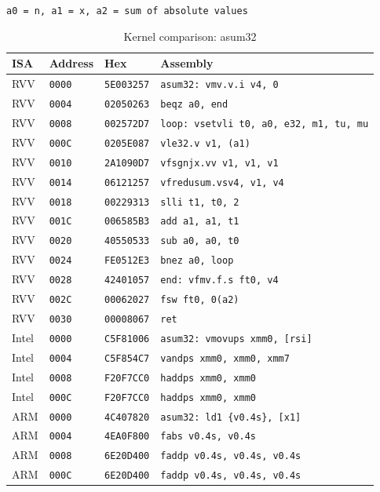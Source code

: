 \begin{table}[htbp]
\centering
\caption{Kernel comparison: asum32}
\begingroup
\scriptsize
\setlength{\tabcolsep}{4pt}
\noindent \texttt{a0 = n, a1 = x, a2 = sum of absolute values}\par
\vspace{0.6ex}
\begin{tabular}{@{}l|l|l|p{7.2cm}@{}}
\toprule
ISA & Address & Hex & Assembly \\
\midrule
RVV & \texttt{0000} & \texttt{5E003257} & \texttt{asum32: vmv.v.i v4, 0} \\
RVV & \texttt{0004} & \texttt{02050263} & \texttt{beqz a0, end} \\
RVV & \texttt{0008} & \texttt{002572D7} & \texttt{loop: vsetvli t0, a0, e32, m1, tu, mu} \\
RVV & \texttt{000C} & \texttt{0205E087} & \texttt{vle32.v v1, (a1)} \\
RVV & \texttt{0010} & \texttt{2A1090D7} & \texttt{vfsgnjx.vv v1, v1, v1} \\
RVV & \texttt{0014} & \texttt{06121257} & \texttt{vfredusum.vsv4, v1, v4} \\
RVV & \texttt{0018} & \texttt{00229313} & \texttt{slli t1, t0, 2} \\
RVV & \texttt{001C} & \texttt{006585B3} & \texttt{add a1, a1, t1} \\
RVV & \texttt{0020} & \texttt{40550533} & \texttt{sub a0, a0, t0} \\
RVV & \texttt{0024} & \texttt{FE0512E3} & \texttt{bnez a0, loop} \\
RVV & \texttt{0028} & \texttt{42401057} & \texttt{end: vfmv.f.s ft0, v4} \\
RVV & \texttt{002C} & \texttt{00062027} & \texttt{fsw ft0, 0(a2)} \\
RVV & \texttt{0030} & \texttt{00008067} & \texttt{ret} \\
\midrule
Intel & \texttt{0000} & \texttt{C5F81006} & \texttt{asum32: vmovups xmm0, [rsi]} \\
Intel & \texttt{0004} & \texttt{C5F854C7} & \texttt{vandps xmm0, xmm0, xmm7} \\
Intel & \texttt{0008} & \texttt{F20F7CC0} & \texttt{haddps xmm0, xmm0} \\
Intel & \texttt{000C} & \texttt{F20F7CC0} & \texttt{haddps xmm0, xmm0} \\
\midrule
ARM & \texttt{0000} & \texttt{4C407820} & \texttt{asum32: ld1 \{v0.4s\}, [x1]} \\
ARM & \texttt{0004} & \texttt{4EA0F800} & \texttt{fabs v0.4s, v0.4s} \\
ARM & \texttt{0008} & \texttt{6E20D400} & \texttt{faddp v0.4s, v0.4s, v0.4s} \\
ARM & \texttt{000C} & \texttt{6E20D400} & \texttt{faddp v0.4s, v0.4s, v0.4s} \\
\bottomrule
\end{tabular}
\endgroup
\end{table}
\noindent{}\par
